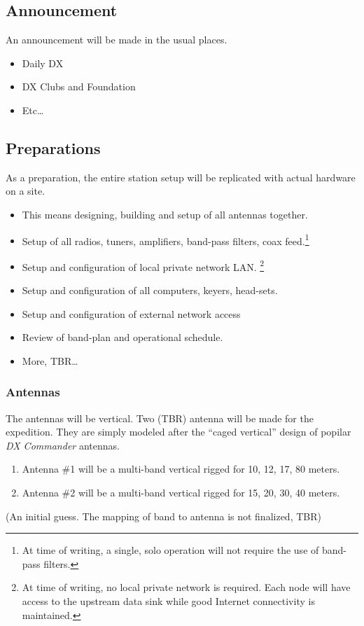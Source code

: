 \documentclass[11pt]{article}
\begin{document}
\subsection{Announcement}

An announcement will be made in the usual places.

\begin{itemize}
\item Daily DX
\item DX Clubs and Foundation
\item Etc\ldots
\end{itemize}

\subsection{Preparations}

As a preparation, the entire station setup will be replicated with actual
hardware on a site.

\begin{itemize}
\item This means designing, building and setup of all antennas together.
\item Setup of all radios, tuners, amplifiers, band-pass filters,
coax feed.\footnote{At time of writing, a single, solo
operation will not require the use of band-pass filters.}
\item Setup and configuration of local private network LAN.
\footnote{At time of writing, no local private network is required. Each
node will have access to the upstream data sink while good Internet
connectivity is maintained.}
\item Setup and configuration of all computers, keyers, head-sets.
\item Setup and configuration of external network access
\item Review of band-plan and operational schedule.
\item More, TBR\ldots
\end{itemize}

\subsubsection{Antennas}

The antennas will be vertical.   Two (TBR) antenna will be made for
the expedition.  They are simply modeled after the ``caged vertical''
design of popilar {\textit{DX Commander}} antennas.
\par
\begin{enumerate}
\item Antenna \#1 will be a multi-band vertical rigged for 10, 12, 17, 80
meters.
\item Antenna \#2 will be a multi-band vertical rigged for 15, 20, 30, 40
meters.
\end{enumerate}
\par
(An initial guess. The mapping of band to antenna is not finalized, TBR)
\par
\end{document}
